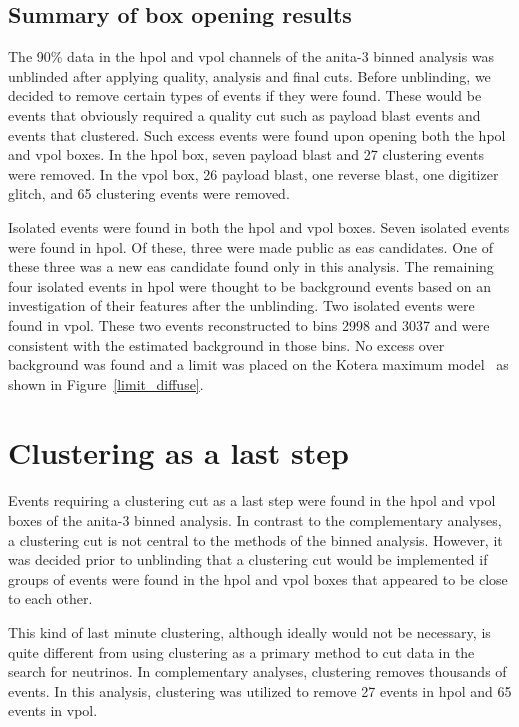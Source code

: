 \subsection{Summary of box opening results}
\label{summary_box}
 
The 90\% data in the \gls{hpol} and \gls{vpol} channels of the \gls{anita}-3 binned analysis was unblinded after applying quality, analysis and final cuts. Before unblinding, we decided to remove certain types of events if they were found. These would be events that obviously required a quality cut such as payload blast events and events that clustered. Such excess events were found upon opening both the \gls{hpol} and \gls{vpol} boxes. In the \gls{hpol} box, seven payload blast and 27 clustering events were removed. In the \gls{vpol} box, 26 payload blast, one reverse blast, one digitizer glitch, and 65 clustering events were removed. 

Isolated events were found in both the \gls{hpol} and \gls{vpol} boxes. Seven isolated events were found in \gls{hpol}. Of these, three were made public as \gls{eas} candidates. One of these three was a new \gls{eas} candidate found only in this analysis. The remaining four isolated events in \gls{hpol} were thought to be background events based on an investigation of their features after the unblinding. Two isolated events were found in \gls{vpol}. These two events reconstructed to bins 2998 and 3037 and were consistent with the estimated background in those bins. No excess over background was found and a limit was placed on the Kotera maximum model~\cite{kotera} as shown in Figure~\ref{limit_diffuse}.


\section{Clustering as a last step}
\label{clustering}

Events requiring a clustering cut as a last step were found in the \gls{hpol} and \gls{vpol} boxes of the \gls{anita}-3 binned analysis. 
In contrast to the complementary analyses, a clustering cut is not central to the methods of the binned analysis. However, it was decided prior to unblinding that a clustering cut would be implemented if groups of events were found in the \gls{hpol} and \gls{vpol} boxes that appeared to be close to each other. 

This kind of last minute clustering, although ideally would not be necessary, is quite different from using clustering as a primary method to cut data in the search for neutrinos. In complementary analyses, clustering removes thousands of events. In this analysis, clustering was utilized to remove 27 events in \gls{hpol} and 65 events in \gls{vpol}. 

